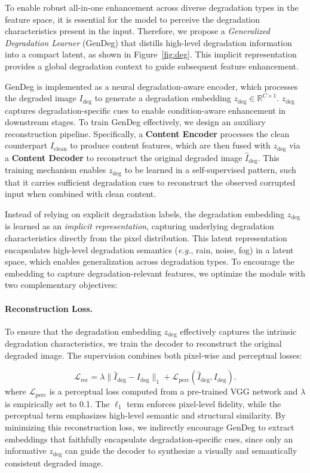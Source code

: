 \documentclass[letterpaper]{article} %
\newcommand{\NAMEdeg}{Generalized Degradation Learner\xspace}
\begin{document}
To enable robust all-in-one enhancement across diverse degradation types in the feature space, it is essential for the model to perceive the degradation characteristics present in the input. Therefore, we propose a \textit{\NAMEdeg} (GenDeg) that distills high-level degradation information into a compact latent, as shown in Figure~\ref{fig:deg}. This implicit representation provides a global degradation context to guide subsequent feature enhancement.

GenDeg is implemented as a neural degradation-aware encoder, which processes the degraded image $I_{\mathrm{deg}}$ to generate a degradation embedding $z_{\mathrm{deg}} \in \mathbb{R}^{C \times 1}$. $z_{\mathrm{deg}}$ captures degradation-specific cues to enable condition-aware enhancement in downstream stages. To train GenDeg effectively, we design an auxiliary reconstruction pipeline. Specifically, a \textbf{Content Encoder} processes the clean counterpart $I_{\mathrm{clean}}$ to produce content features, which are then fused with $z_{\mathrm{deg}}$ via a \textbf{Content Decoder} to reconstruct the original degraded image $\hat{I}_{\mathrm{deg}}$. This training mechanism enables $z_{\mathrm{deg}}$ to be learned in a self-supervised pattern, such that it carries sufficient degradation cues to reconstruct the observed corrupted input when combined with clean content.

Instead of relying on explicit degradation labels, the degradation embedding $z_{\mathrm{deg}}$ is learned as an \textit{implicit representation}, capturing underlying degradation characteristics directly from the pixel distribution. This latent representation encapsulates high-level degradation semantics (\textit{e.g.}, rain, noise, fog) in a latent space, which enables generalization across degradation types. To encourage the embedding to capture degradation-relevant features, we optimize the module with two complementary objectives:


\paragraph{Reconstruction Loss.} 
To ensure that the degradation embedding $z_{\mathrm{deg}}$ effectively captures the intrinsic degradation characteristics, we train the decoder to reconstruct the original degraded image. The supervision combines both pixel-wise and perceptual losses:

\begin{equation}
    \mathcal{L}_{\mathrm{rec}} =  \lambda\| \hat{I}_{\mathrm{deg}} - I_{\mathrm{deg}} \|_1 +  \mathcal{L}_{\mathrm{perc}}(\hat{I}_{\mathrm{deg}}, I_{\mathrm{deg}}).
\end{equation}
where $\mathcal{L}_{\mathrm{perc}}$ is a perceptual loss computed from a pre-trained VGG network and \(\lambda\) is empirically set to 0.1. The $\ell_1$ term enforces pixel-level fidelity, while the perceptual term emphasizes high-level semantic and structural similarity. By minimizing this reconstruction loss, we indirectly encourage GenDeg to extract embeddings that faithfully encapsulate degradation-specific cues, since only an informative $z_{\mathrm{deg}}$ can guide the decoder to synthesize a visually and semantically consistent degraded image.
\end{document}
